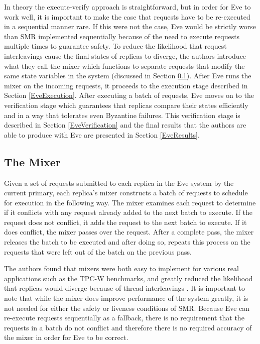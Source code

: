 \documentclass[11pt, oneside]{report}
\begin{document}
In theory the execute-verify approach is straightforward, but in order for Eve to work well, it is important to make the case that requests have to be re-executed in a sequential manner rare. 
If this were not the case, Eve would be strictly worse than SMR implemented sequentially because of the need to execute requests multiple times to guarantee safety. 
To reduce the likelihood that request interleavings cause the final states of replicas to diverge, the authors introduce what they call the mixer which functions to separate requests that modify the same state variables in the system (discussed in Section \ref{EveMixer}). 
After Eve runs the mixer on the incoming requests, it proceeds to the execution stage described in Section \ref{EveExecution}. 
After executing a batch of requests, Eve moves on to the verification stage which guarantees that replicas compare their states efficiently and in a way that tolerates even Byzantine failures. 
This verification stage is described in Section \ref{EveVerification} and the final results that the authors are able to produce with Eve are presented in Section \ref{EveResults}.

\subsection{The Mixer}\label{EveMixer}
Given a set of requests submitted to each replica in the Eve system by the current primary, each replica's mixer constructs a batch of requests to schedule for execution in the following way. 
The mixer examines each request to determine if it conflicts with any request already added to the next batch to execute. 
If the request does not conflict, it adds the request to the next batch to execute. 
If it does conflict, the mixer passes over the request. 
After a complete pass, the mixer releases the batch to be executed and after doing so, repeats this process on the requests that were left out of the batch on the previous pass.

The authors found that mixers were both easy to implement for various real applications such as the TPC-W benchmarks, and greatly reduced the likelihood that replicas would diverge because of thread interleavings \cite{eve}. 
It is important to note that while the mixer does improve performance of the system greatly, it is not needed for either the safety or liveness conditions of SMR. 
Because Eve can re-execute requests sequentially as a fallback, there is no requirement that the requests in a batch do not conflict and therefore there is no required accuracy of the mixer in order for Eve to be correct.
\end{document}
